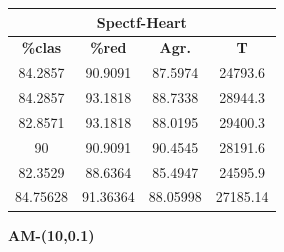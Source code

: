 \documentclass[11pt,a4paper]{article}
\theoremstyle{definition}
\begin{document}
\begin{tabbing}
{		\begin{tabular}{|c|c|c|c|}
			\hline
			\multicolumn{4}{|c|}{\textbf{Spectf-Heart}} \\ \hline
			\textbf{\%clas} & \textbf{\%red} & \textbf{Agr.} & \textbf{T} \\ \hline 
			84.2857 & 90.9091 & 87.5974 & 24793.6\\ \hline
84.2857 & 93.1818 & 88.7338 & 28944.3\\ \hline
82.8571 & 93.1818 & 88.0195 & 29400.3\\ \hline
90 & 90.9091 & 90.4545 & 28191.6\\ \hline
82.3529 & 88.6364 & 85.4947 & 24595.9\\ \hline
84.75628 & 91.36364 & 88.05998 & 27185.14\\ \hline
		\end{tabular}
		}
	\end{tabbing}
	
	\textbf{AM-(10,0.1)}	
	
\end{document}
